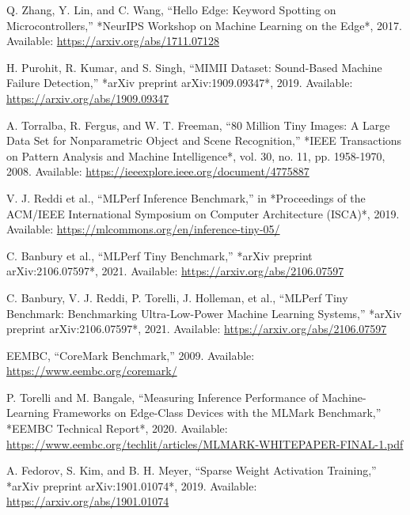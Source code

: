 \documentclass[conference]{IEEEtran}
\begin{document}
\begin{thebibliography}{00}
 Q. Zhang, Y. Lin, and C. Wang, ``Hello Edge: Keyword Spotting on Microcontrollers,'' *NeurIPS Workshop on Machine Learning on the Edge*, 2017. Available: \url{https://arxiv.org/abs/1711.07128}

 H. Purohit, R. Kumar, and S. Singh, ``MIMII Dataset: Sound-Based Machine Failure Detection,'' *arXiv preprint arXiv:1909.09347*, 2019. Available: \url{https://arxiv.org/abs/1909.09347}

 A. Torralba, R. Fergus, and W. T. Freeman, ``80 Million Tiny Images: A Large Data Set for Nonparametric Object and Scene Recognition,'' *IEEE Transactions on Pattern Analysis and Machine Intelligence*, vol. 30, no. 11, pp. 1958-1970, 2008. Available: \url{https://ieeexplore.ieee.org/document/4775887}




 V. J. Reddi et al., ``MLPerf Inference Benchmark,'' in *Proceedings of the ACM/IEEE International Symposium on Computer Architecture (ISCA)*, 2019. Available: \url{https://mlcommons.org/en/inference-tiny-05/}

 C. Banbury et al., ``MLPerf Tiny Benchmark,'' *arXiv preprint arXiv:2106.07597*, 2021. Available: \url{https://arxiv.org/abs/2106.07597}

 C. Banbury, V. J. Reddi, P. Torelli, J. Holleman, et al., ``MLPerf Tiny Benchmark: Benchmarking Ultra-Low-Power Machine Learning Systems,'' *arXiv preprint arXiv:2106.07597*, 2021. Available: \url{https://arxiv.org/abs/2106.07597}

 EEMBC, ``CoreMark Benchmark,'' 2009. Available: \url{https://www.eembc.org/coremark/}

 P. Torelli and M. Bangale, ``Measuring Inference Performance of Machine-Learning Frameworks on Edge-Class Devices with the MLMark Benchmark,'' *EEMBC Technical Report*, 2020. Available: \url{https://www.eembc.org/techlit/articles/MLMARK-WHITEPAPER-FINAL-1.pdf}

 A. Fedorov, S. Kim, and B. H. Meyer, ``Sparse Weight Activation Training,'' *arXiv preprint arXiv:1901.01074*, 2019. Available: \url{https://arxiv.org/abs/1901.01074}

\end{thebibliography}

\vspace{12pt}
\end{document}
